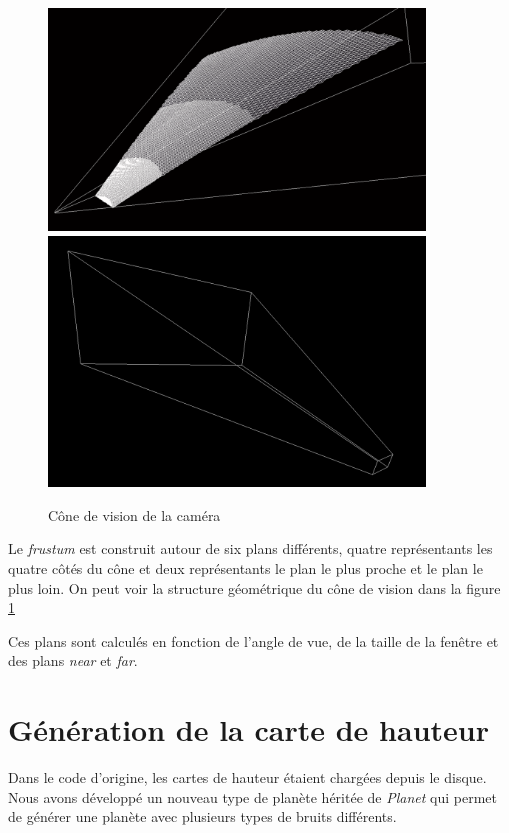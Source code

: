   \begin{figure}
  \centering
  \includegraphics[width=10cm]{img/culling.png}
  \includegraphics[width=10cm]{img/frustumbox.png}
  \caption{Cône de vision de la caméra \protect\footnotemark}
  \label{fig:culling}
  \end{figure}

 
  Le \textit{frustum} est construit autour de six plans différents, quatre représentants les quatre côtés du cône et deux représentants le plan le plus proche et le plan le plus loin.
  On peut voir la structure géométrique du cône de vision dans la figure \ref{fig:culling}
  
  Ces plans sont calculés en fonction de l'angle de vue, de la taille de la fenêtre et des plans \textit{near} et \textit{far}.
  
  \section{Génération de la carte de hauteur}
  
  Dans le code d'origine, les cartes de hauteur étaient chargées depuis le disque. Nous avons développé un nouveau type de planète héritée de \textit{Planet} qui permet de générer une planète avec plusieurs types de bruits différents.
  
